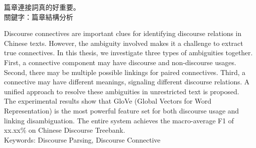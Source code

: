\begin{abstractzh}

篇章連接詞真的好重要。\\

\noindent
關鍵字：篇章結構分析

\end{abstractzh}

\begin{abstracten}

Discourse connectives are important clues for identifying discourse
relations in Chinese texts. However, the ambiguity involved makes
it a challenge to extract true connectives. In this thesis, we investigate
three types of ambiguities together. First, a connective component may have 
discourse and non-discourse usages. Second, there may be multiple possible
linkings for paired connectives. Third, a connective may have different
meanings, signaling different discourse relations. A unified approach 
to resolve these ambiguities in unrestricted text is
proposed. The experimental results show that GloVe (Global Vectors for 
Word Representation) is the most powerful feature set for both discourse 
usage and linking disambiguation. The entire system achieves the 
macro-average F1 of xx.xx\% on Chinese Discourse Treebank. \\ 

\noindent
Keywords: Discourse Parsing, Discourse Connective
\end{abstracten}

